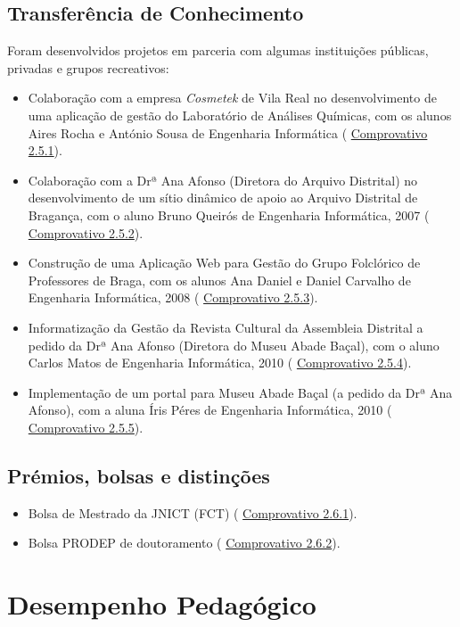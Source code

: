 \documentclass[11pt]{article}
\begin{document}
\subsection{Transferência de Conhecimento}Foram desenvolvidos projetos em parceria com algumas instituições públicas, privadas e grupos recreativos:
\begin{itemize}
\item{Colaboração com a empresa {
\em{ Cosmetek}} de Vila Real no desenvolvimento de uma aplicação de gestão do Laboratório de Análises Químicas, com os alunos Aires Rocha e António Sousa de Engenharia Informática (
\href{run:CoOrientTrabalhos/emdesenvolvimento/cosmetek.pdf}{Comprovativo 2.5.1}).}
\item{Colaboração com a Drª Ana Afonso (Diretora do Arquivo Distrital) no desenvolvimento de um sítio dinâmico de apoio ao Arquivo Distrital de Bragança, com o aluno Bruno Queirós de Engenharia Informática, 2007 (
\href{run:CoOrientTrabalhos/projFimCursoEI.pdf}{Comprovativo 2.5.2}).}
\item{Construção de uma Aplicação Web para Gestão do Grupo Folclórico de Professores de Braga, com os alunos Ana Daniel e Daniel Carvalho de Engenharia Informática, 2008 (
\href{run:CoOrientTrabalhos/projFimCursoEI.pdf}{Comprovativo 2.5.3}).}
\item{Informatização da Gestão da Revista Cultural da Assembleia Distrital a pedido da Drª Ana Afonso (Diretora do Museu Abade Baçal), com o aluno Carlos Matos de Engenharia Informática, 2010 (
\href{run:CoOrientTrabalhos/projFimCursoEI.pdf}{Comprovativo 2.5.4}).}
\item{Implementação de um portal para  Museu Abade Baçal (a pedido da Drª Ana Afonso), com a aluna Íris Péres de Engenharia Informática, 2010 (
\href{run:CoOrientTrabalhos/projFimCursoEI.pdf}{Comprovativo 2.5.5}).}
\end{itemize}
\subsection{Prémios, bolsas e distinções}
\begin{itemize}
\item{Bolsa de Mestrado da JNICT (FCT) (
\href{run:Bolsas/fctMest.pdf}{Comprovativo 2.6.1}).}
\item{Bolsa PRODEP de doutoramento (
\href{run:Bolsas/prodepPHD.pdf}{Comprovativo 2.6.2}).}
\end{itemize}
\section{Desempenho Pedagógico}
\end{document}
